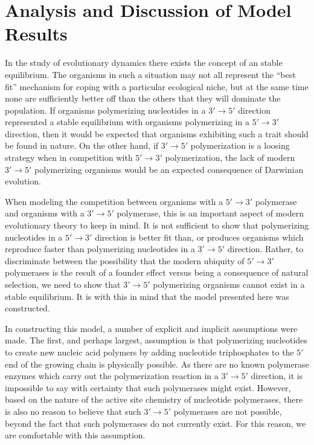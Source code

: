 \chapter{Analysis and Discussion of Model Results} %
\label{cha:analysis_of_model_results}
In the study of evolutionary dynamics there exists the concept of an stable equilibrium. The organisms in such a situation may not all represent the ``best fit'' mechanism for coping with a particular ecological niche, but at the same time none are sufficiently better off than the others that they will dominate the population. If organisms polymerizing nucleotides in a $3'\to5'$ direction represented a stable equilibrium with organisms polymerizing in a $5'\to3'$ direction, then it would be expected that organisms exhibiting such a trait should be found in nature. On the other hand, if $3'\to5'$ polymerization is a loosing strategy when in competition with $5'\to3'$ polymerization, the lack of modern $3'\to5'$ polymerizing organisms would be an expected consequence of Darwinian evolution.

When modeling the competition between organisms with a $5'\to3'$ polymerase and organisms with a $3'\to5'$ polymerase, this is an important aspect of modern evolutionary theory to keep in mind. It is not sufficient to show that polymerizing nucleotides in a $5'\to3'$ direction is better fit than, or produces organisms which reproduce faster than polymerizing nucleotides in a $3'\to5'$ direction. Rather, to discriminate between the possibility that the modern ubiquity of $5'\to3'$ polymerases is the result of a founder effect versus being a consequence of natural selection, we need to show that $3'\to5'$ polymerizing organisms cannot exist in a stable equilibrium. It is with this in mind that the model presented here was constructed.

In constructing this model, a number of explicit and implicit assumptions were made. The first, and perhaps largest, assumption is that polymerizing nucleotides to create new nucleic acid polymers by adding nucleotide triphosphates to the $5'$ end of the growing chain is physically possible. As there are no known polymerase enzymes which carry out the polymerization reaction in a $3'\to5'$ direction, it is impossible to say with certainty that such polymerases might exist. However, based on the nature of the active site chemistry of nucleotide polymerases, there is also no reason to believe that such $3'\to5'$ polymerases are not possible, beyond the fact that such polymerases do not currently exist. For this reason, we are comfortable with this assumption.

